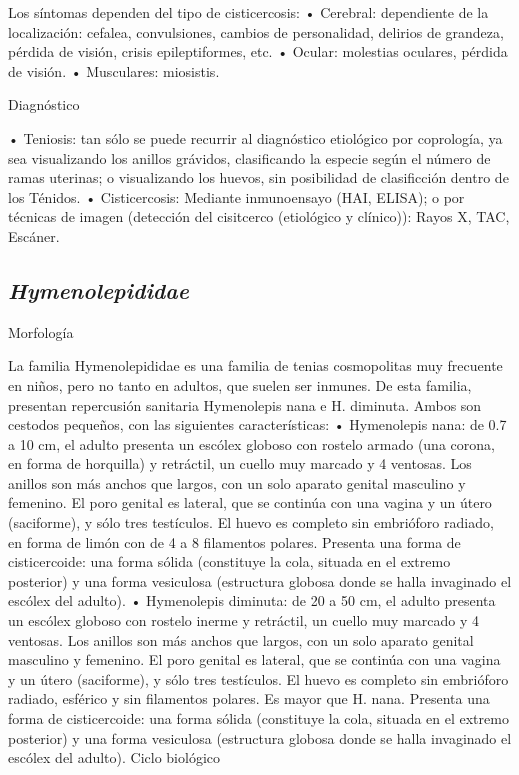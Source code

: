 Los síntomas dependen del tipo de cisticercosis:
• Cerebral: dependiente de la localización: cefalea, convulsiones, cambios de personalidad, delirios de grandeza, pérdida de visión, crisis epileptiformes, etc.
• Ocular: molestias oculares, pérdida de visión.
• Musculares: miosistis.

Diagnóstico

• Teniosis: tan sólo se puede recurrir al diagnóstico etiológico por coprología, ya sea visualizando los anillos grávidos, clasificando la especie según el número de ramas uterinas; o visualizando los huevos, sin posibilidad de clasificción dentro de los Ténidos.
• Cisticercosis: Mediante inmunoensayo (HAI, ELISA); o por técnicas de imagen (detección del cisitcerco (etiológico y clínico)): Rayos X, TAC, Escáner.
\newpage
\subsection{\textit{Hymenolepididae}}
Morfología

La familia Hymenolepididae es una familia de tenias cosmopolitas muy frecuente en niños, pero no tanto en adultos, que suelen ser inmunes. De esta familia, presentan repercusión sanitaria Hymenolepis nana e H. diminuta. Ambos son cestodos pequeños, con las siguientes características:
• Hymenolepis nana: de 0.7 a 10 cm, el adulto presenta un escólex globoso con rostelo armado (una corona, en forma de horquilla) y retráctil, un cuello muy marcado y 4 ventosas. Los anillos son más anchos que largos, con un solo aparato genital masculino y femenino. El poro genital es lateral, que se continúa con una vagina y un útero (saciforme), y sólo tres testículos.
El huevo es completo sin embrióforo radiado, en forma de limón con de 4 a 8 filamentos polares.
Presenta una forma de cisticercoide: una forma sólida (constituye la cola, situada en el extremo posterior) y una forma vesiculosa (estructura globosa donde se halla invaginado el escólex del adulto).
• Hymenolepis diminuta: de 20 a 50 cm, el adulto presenta un escólex globoso con rostelo inerme y retráctil, un cuello muy marcado y 4 ventosas. Los anillos son más anchos que largos, con un solo aparato genital masculino y femenino. El poro genital es lateral, que se continúa con una vagina y un útero (saciforme), y sólo tres testículos.
El huevo es completo sin embrióforo radiado, esférico y sin filamentos polares. Es mayor que H. nana.
Presenta una forma de cisticercoide: una forma sólida (constituye la cola, situada en el extremo posterior) y una forma vesiculosa (estructura globosa donde se halla invaginado el escólex del adulto).
Ciclo biológico

